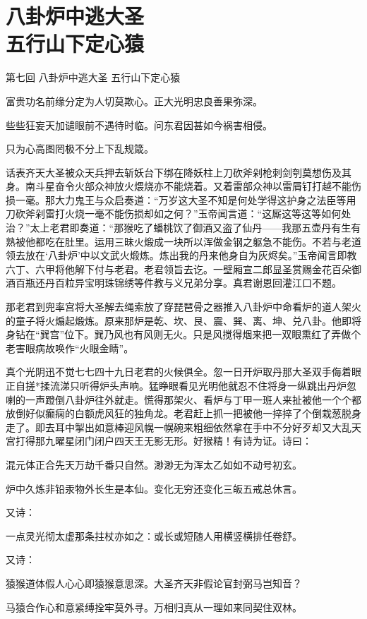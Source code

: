 \documentclass[12pt,UTF8]{ctexbook}
\begin{document}
{\chapter[八卦炉中逃大圣\ 五行山下定心猿]{八卦炉中逃大圣\\五行山下定心猿}

第七回 八卦炉中逃大圣 五行山下定心猿

富贵功名前缘分定为人切莫欺心。正大光明忠良善果弥深。

些些狂妄天加谴眼前不遇待时临。问东君因甚如今祸害相侵。

只为心高图罔极不分上下乱规箴。

话表齐天大圣被众天兵押去斩妖台下绑在降妖柱上刀砍斧剁枪刺剑刳莫想伤及其身。南斗星奋令火部众神放火煨烧亦不能烧着。又着雷部众神以雷屑钉打越不能伤损一毫。那大力鬼王与众启奏道：“万岁这大圣不知是何处学得这护身之法臣等用刀砍斧剁雷打火烧一毫不能伤损却如之何？”玉帝闻言道：“这厮这等这等如何处治？”太上老君即奏道：“那猴吃了蟠桃饮了御酒又盗了仙丹——我那五壶丹有生有熟被他都吃在肚里。运用三昧火煅成一块所以浑做金钢之躯急不能伤。不若与老道领去放在‘八卦炉’中以文武火煅炼。炼出我的丹来他身自为灰烬矣。”玉帝闻言即教六丁、六甲将他解下付与老君。老君领旨去讫。一壁厢宣二郎显圣赏赐金花百朵御酒百瓶还丹百粒异宝明珠锦绣等件教与义兄弟分享。真君谢恩回灌江口不题。

那老君到兜率宫将大圣解去绳索放了穿琵琶骨之器推入八卦炉中命看炉的道人架火的童子将火煽起煅炼。原来那炉是乾、坎、艮、震、巽、离、坤、兑八卦。他即将身钻在“巽宫”位下。巽乃风也有风则无火。只是风搅得烟来把一双眼熏红了弄做个老害眼病故唤作“火眼金睛”。

真个光阴迅不觉七七四十九日老君的火候俱全。忽一日开炉取丹那大圣双手侮着眼正自搓*揉流涕只听得炉头声响。猛睁眼看见光明他就忍不住将身一纵跳出丹炉忽喇的一声蹬倒八卦炉往外就走。慌得那架火、看炉与丁甲一班人来扯被他一个个都放倒好似癫痫的白额虎风狂的独角龙。老君赶上抓一把被他一捽捽了个倒栽葱脱身走了。即去耳中掣出如意棒迎风幌一幌碗来粗细依然拿在手中不分好歹却又大乱天宫打得那九曜星闭门闭户四天王无影无形。好猴精！有诗为证。诗曰：

混元体正合先天万劫千番只自然。渺渺无为浑太乙如如不动号初玄。

炉中久炼非铅汞物外长生是本仙。变化无穷还变化三皈五戒总休言。

又诗：

一点灵光彻太虚那条拄杖亦如之：或长或短随人用横竖横排任卷舒。

又诗：

猿猴道体假人心心即猿猴意思深。大圣齐天非假论官封弼马岂知音？

马猿合作心和意紧缚拴牢莫外寻。万相归真从一理如来同契住双林。

}
\end{document}
